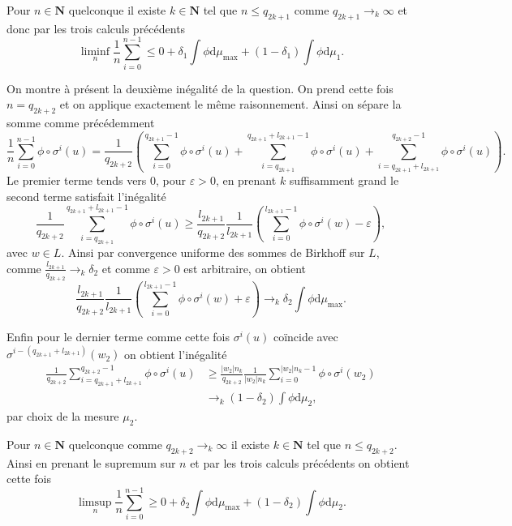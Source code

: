 \documentclass[12pt]{article}
\newcommand{\N}{\mathbf{N}}
\newcommand{\de}{\mathrm{d}}
\begin{document}
\medskip

Pour $n \in \N$ quelconque il existe $k \in \N$ tel que $n \le q_{2k+1}$ comme $q_{2k+1}\to_{k} \infty$ et donc par les trois calculs précédents \[
        \liminf_{n}\frac{1}{n}\sum_{i=0}^{n-1} \le 0 + \delta_{1}\int\phi\de\mu_{\max} + (1-\delta_{1})\int\phi\de\mu_{1}
.\]  

\medskip

On montre à présent la deuxième inégalité de la question. On prend cette fois $n = q_{2k+2}$ et on applique exactement le même raisonnement.
Ainsi on sépare la somme comme précédemment \[
        \frac{1}{n}\sum_{i=0}^{n-1} \phi\circ\sigma^{i}(u) = \frac{1}{q_{2k+2}}(\sum_{i=0}^{q_{2k+1}-1} \phi\circ\sigma^{i}(u) + \sum_{i=q_{2k+1}}^{q_{2k+1}+l_{2k+1}-1} \phi\circ\sigma^{i}(u) + \sum_{i=q_{2k+1}+l_{2k+1}}^{q_{2k+2}-1} \phi\circ\sigma^{i}(u))
.\] 
Le premier terme tends vers 0, pour $\varepsilon > 0$, en prenant $k$ suffisamment grand le second terme satisfait l'inégalité \[
        \frac{1}{q_{2k+2}}\sum_{i=q_{2k+1}}^{q_{2k+1}+l_{2k+1}-1} \phi\circ\sigma^{i}(u) \ge \frac{l_{2k+1}}{q_{2k+2}}\frac{1}{l_{2k+1}}(\sum_{i=0}^{l_{2k+1}-1} \phi\circ\sigma^{i}(w) - \varepsilon) 
,\] avec $w \in L$. Ainsi par convergence uniforme des sommes de Birkhoff sur $L$, comme $\frac{l_{2k+1}}{q_{2k+2}}\to_{k}\delta_{2}$ et comme $\varepsilon > 0$ est arbitraire, on obtient  \[
\frac{l_{2k+1}}{q_{2k+2}}\frac{1}{l_{2k+1}}(\sum_{i=0}^{l_{2k+1}-1} \phi\circ\sigma^{i}(w) + \varepsilon) \to_{k} \delta_{2}\int\phi\de\mu_{\max} 
.\] 

Enfin pour le dernier terme comme cette fois $\sigma^{i}(u)$ coïncide avec $\sigma^{i-(q_{2k+1}+l_{2k+1})}(w_{2})$ on obtient l'inégalité
\begin{align*}
        \frac{1}{q_{2k+2}}\sum_{i=q_{2k+1}+l_{2k+1}}^{q_{2k+2}-1} \phi\circ\sigma^{i}(u) &\ge \frac{|w_{2}|n_{k}}{q_{2k+2}}\frac{1}{|w_{2}|n_{k}}\sum_{i=0}^{|w_{2}|n_{k}-1} \phi\circ\sigma^{i}(w_{2}) \\
                                                                                     &\to_{k}(1-\delta_{2})\int\phi\de\mu_{2}
,\end{align*} par choix de la mesure $\mu_{2}$.

Pour $n \in \N$ quelconque comme $q_{2k+2}\to_{k}\infty$ il existe $k \in \N$ tel que $n \le q_{2k+2}$. Ainsi en prenant le supremum sur $n$ et par les trois calculs précédents on obtient cette fois  \[
        \limsup_{n}\frac{1}{n}\sum_{i=0}^{n-1} \ge 0 + \delta_{2}\int\phi\de\mu_{\max} + (1-\delta_{2})\int\phi\de\mu_{2}
.\]
\end{document}
